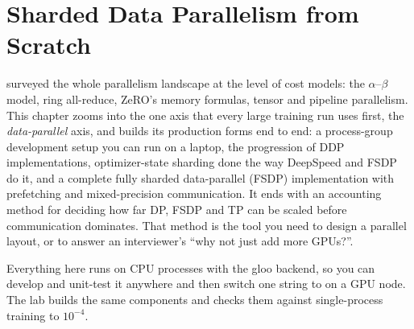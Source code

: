 \chapter{Sharded Data Parallelism from Scratch}\label{ch:sharding}

 surveyed the whole parallelism landscape at the level of cost models:
the $\alpha$--$\beta$ model, ring all-reduce, ZeRO's memory formulas, tensor and pipeline
parallelism. This chapter zooms into the one axis that every large training run uses first, the
\emph{data-parallel} axis, and builds its production forms end to end: a process-group development
setup you can run on a laptop, the progression of DDP implementations, optimizer-state sharding
done the way DeepSpeed and FSDP do it, and a complete fully sharded data-parallel (FSDP)
implementation with prefetching and mixed-precision communication. It ends with an accounting
method for deciding how far DP, FSDP and TP can be scaled before communication dominates. That
method is the tool you need to design a parallel layout, or to answer an interviewer's ``why not
just add more GPUs?''.

Everything here runs on CPU processes with the gloo backend, so you can develop and unit-test it
anywhere and then switch one string to  on a GPU node. The lab builds the same
components and checks them against single-process training to $10^{-4}$.

